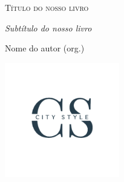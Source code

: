 




\thispagestyle{plain}


\begingroup

\thispagestyle{empty}

  \vspace*{.12\textheight} 




                      \Huge 
                      \textsc{Título do nosso livro}
                      

                      \LARGE
                      \textit{Subtítulo do nosso livro}
                      \bigskip
                      
                      \normalsize 
                      Nome do autor (org.)

\endgroup
\vfill
\hfill\includegraphics[width=5cm]{logo}
\pagebreak
